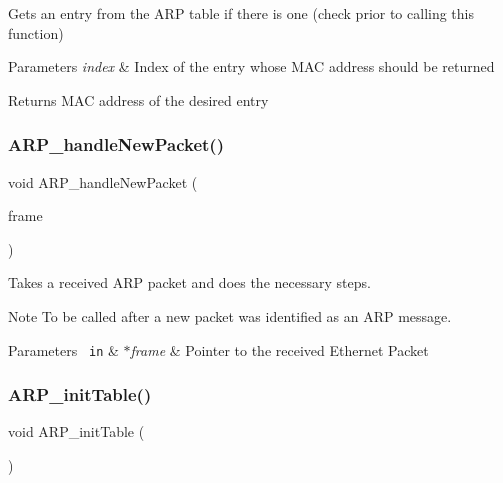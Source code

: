 Gets an entry from the A\+RP table if there is one (check prior to calling this function) 


\begin{DoxyParams}{Parameters}
{\em index} & Index of the entry whose M\+AC address should be returned \\
\hline
\end{DoxyParams}
\begin{DoxyReturn}{Returns}
M\+AC address of the desired entry 
\end{DoxyReturn}
\mbox{\label{group__arp_ga1ba858e52bf34bca0e5260f0dc0e4641}} 
\subsubsection{\texorpdfstring{ARP\_handleNewPacket()}{ARP\_handleNewPacket()}}
{\footnotesize\ttfamily void A\+R\+P\+\_\+handle\+New\+Packet (\begin{DoxyParamCaption}\item[{\mbox{\hyperlink{group__ethernet_ga7519a7ae14b490659069435698d28a25}{ethernet\+Frame\+\_\+t}} $\ast$}]{frame }\end{DoxyParamCaption})}



Takes a received A\+RP packet and does the necessary steps. 

\begin{DoxyNote}{Note}
To be called after a new packet was identified as an A\+RP message. 
\end{DoxyNote}

\begin{DoxyParams}[1]{Parameters}
\mbox{\texttt{ in}}  & {\em $\ast$frame} & Pointer to the received Ethernet Packet \\
\hline
\end{DoxyParams}
\mbox{\label{group__arp_ga35f276b970aa00ca18990c7ddc63a65e}} 
\subsubsection{\texorpdfstring{ARP\_initTable()}{ARP\_initTable()}}
{\footnotesize\ttfamily void A\+R\+P\+\_\+init\+Table (\begin{DoxyParamCaption}{ }\end{DoxyParamCaption})}



